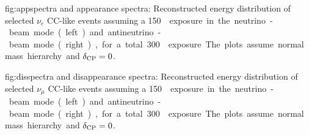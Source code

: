 \begin{dunefigure}{fig:appspectra}
{\nue and \anue appearance spectra: Reconstructed energy distribution of selected $\nu_e$ CC-like events assuming a \SI{150}~\ktMWyr{} exposure in the neutrino-beam mode (left) and antineutrino-beam mode (right), for a total \SI{300}~\ktMWyr{} exposure.  The plots assume normal mass hierarchy and $\delta_{\rm CP} = 0$.}
\end{dunefigure}



\begin{dunefigure}{fig:disspectra}
{\numu and \anumu disappearance spectra: Reconstructed energy distribution of selected $\nu_{\mu}$ CC-like events assuming a \SI{150}~\ktMWyr{} exposure in the neutrino-beam mode (left) and antineutrino-beam mode (right), for a total \SI{300}~\ktMWyr{} exposure.  The plots assume normal mass hierarchy and $\delta_{\rm CP} = 0$. }
\end{dunefigure}



